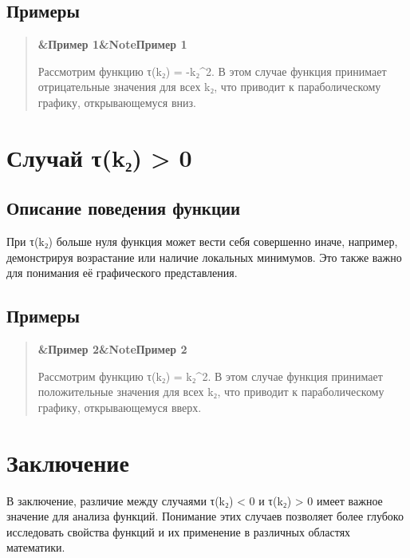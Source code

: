 \documentclass[a4paper]{article}
\newcommand{\boxheading}[1]{%
  \par\smallskip
  \noindent\textbf{\ifx&#1&Note\else#1\fi}\par
  \smallskip
}
\newenvironment{exbox}[1][]{%
  \begin{quote}\color{brown!70!black}\boxheading{#1}\normalcolor
}{\end{quote}}
\begin{document}
\subsection{Примеры}
\begin{exbox}[Пример 1]
Рассмотрим функцию τ(k₂) = -k₂^2. В этом случае функция принимает отрицательные значения для всех k₂, что приводит к параболическому графику, открывающемуся вниз.
\end{exbox}

\section{Случай τ(k₂) > 0}
\subsection{Описание поведения функции}
При τ(k₂) больше нуля функция может вести себя совершенно иначе, например, демонстрируя возрастание или наличие локальных минимумов. Это также важно для понимания её графического представления.

\subsection{Примеры}
\begin{exbox}[Пример 2]
Рассмотрим функцию τ(k₂) = k₂^2. В этом случае функция принимает положительные значения для всех k₂, что приводит к параболическому графику, открывающемуся вверх.
\end{exbox}

\section{Заключение}
В заключение, различие между случаями τ(k₂) < 0 и τ(k₂) > 0 имеет важное значение для анализа функций. Понимание этих случаев позволяет более глубоко исследовать свойства функций и их применение в различных областях математики.
\end{document}
